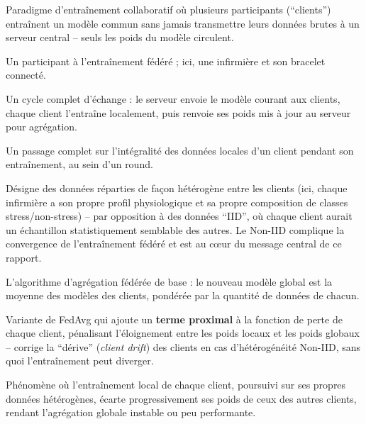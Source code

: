 \documentclass[11pt]{article}
\begin{document}
\begin{description}[leftmargin=0em, style=nextline]

\item[Apprentissage fédéré (\textit{Federated Learning}, FL)] Paradigme
d'entraînement collaboratif où plusieurs participants (``clients'') entraînent un modèle
commun sans jamais transmettre leurs données brutes à un serveur central -- seuls les
poids du modèle circulent.

\item[Client] Un participant à l'entraînement fédéré ; ici, une infirmière et son
bracelet connecté.

\item[Round] Un cycle complet d'échange : le serveur envoie le modèle courant aux
clients, chaque client l'entraîne localement, puis renvoie ses poids mis à jour au
serveur pour agrégation.

\item[Époque (\textit{epoch})] Un passage complet sur l'intégralité des données locales
d'un client pendant son entraînement, au sein d'un round.

\item[Non-IID (\textit{non independent and identically distributed})] Désigne des
données réparties de façon hétérogène entre les clients (ici, chaque infirmière a son
propre profil physiologique et sa propre composition de classes stress/non-stress) --
par opposition à des données ``IID'', où chaque client aurait un échantillon
statistiquement semblable des autres. Le Non-IID complique la convergence de
l'entraînement fédéré et est au cœur du message central de ce rapport.

\item[FedAvg] L'algorithme d'agrégation fédérée de base : le nouveau modèle global est la
moyenne des modèles des clients, pondérée par la quantité de données de chacun.

\item[FedProx] Variante de FedAvg qui ajoute un \textbf{terme proximal} à la fonction de
perte de chaque client, pénalisant l'éloignement entre les poids locaux et les poids
globaux -- corrige la ``dérive'' (\textit{client drift}) des clients en cas
d'hétérogénéité Non-IID, sans quoi l'entraînement peut diverger.

\item[Dérive des clients (\textit{client drift})] Phénomène où l'entraînement local de
chaque client, poursuivi sur ses propres données hétérogènes, écarte progressivement ses
poids de ceux des autres clients, rendant l'agrégation globale instable ou peu
performante.


\end{description}
\end{document}
